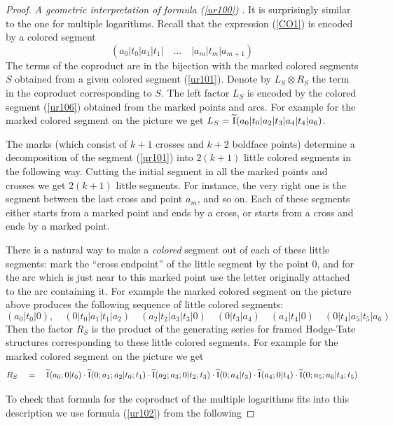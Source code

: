 \documentclass[10pt]{article}
\begin{document}
\begin{proof}
{\it A geometric interpretation of formula 
(\ref{ur100}) }. It is surprisingly similar to the 
one  for multiple logarithms. 
Recall that the expression (\ref{CO1}) 
is encoded by a colored segment 
\begin{equation}  \label{ur101} 
(a_0| t_0| a_1| t_1| \quad ... \quad |a_m|t_m|a_{m+1}) 
\end{equation}
The terms of the coproduct are in the bijection with the marked colored 
segments $S$ obtained from  a given colored segment (\ref{ur101}). 
Denote by $L_S \otimes R_S$ the term in the coproduct corresponding to $S$. 
The left factor $L_S$ 
is encoded by the colored segment (\ref{ur106}) obtained from the marked points and arcs. For example 
for the marked colored segment on the picture  we get
$
L_S = \widetilde {\rm I}(a_{0}|t_0|a_2|t_3|a_4|t_4|a_6)
$. 

The marks (which consist of $k+1$ crosses and $k+2$ boldface points) 
determine a decomposition of the segment (\ref{ur101}) 
into $2(k+1)$ 
little colored segments in the following way. Cutting 
the initial segment in all the marked points and crosses we get 
$2(k+1)$ little segments. For instance, the very right one is 
the segment between the last cross and  point $a_m$, and so on.  
Each of these segments either starts
 from a marked point and ends by a cross, or starts from a 
cross and ends by a marked point. 

There is a natural way to make 
 a {\it colored} segment out of each of these  
little segments: mark
 the ``cross endpoint'' of the little segment by the point $0$, and for the arc which is just near to this marked point use the 
letter originally attached to the arc containing it. 
For example the marked colored segment on the picture above produces 
the following sequence of little colored segments:
$$
(a_0|t_0|0), \quad (0|t_0|a_1|t_1|a_2) \quad (a_2|t_2|a_3|t_3|0) \quad (0|t_3| 
a_4) \quad (a_4| t_4|0) \quad (0|t_4|a_5|t_5|a_6)
$$
Then the factor $R_S$ is the product of the generating series for framed Hodge-Tate 
structures corresponding to these little colored segments. 
For example for the marked colored segment on the picture we get 
$$
R_S \quad = \quad \widetilde {\rm I}(a_0;  0|t_0) \cdot \widetilde {\rm I}(0; a_1; a_2|t_0; t_1) 
\cdot 
\widetilde {\rm I}(a_2; a_3; 0|t_2;t_3) \cdot \widetilde {\rm I}(0; a_4|t_3)  \cdot 
\widetilde {\rm I}(a_4; 0|t_4) \cdot \widetilde {\rm I}(0; a_5; a_6|t_4; t_5)
$$ 

To check that formula for the coproduct of the multiple logarithms fits 
into this description we use formula (\ref{ur102}) from the following 


\end{proof}
\end{document}

